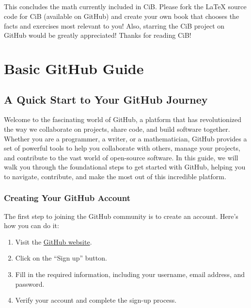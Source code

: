 \documentclass[a4paper,12pt]{book}
\begin{document}
\paragraph{}
This concludes the math currently included in CiB. Please fork the LaTeX source code for CiB (available on GitHub) and create your own book that chooses the facts and exercises most relevant to you! Also, starring the CiB project on GitHub would be greatly appreciated! Thanks for reading CiB!


\clearpage
{}
\appendix
\renewcommand{\thechapter}{\Roman{chapter}} %

\chapter{Basic GitHub Guide}
\section*{A Quick Start to Your GitHub Journey}

Welcome to the fascinating world of GitHub, a platform that has revolutionized the way we collaborate on projects, share code, and build software together. Whether you are a programmer, a writer, or a mathematician, GitHub provides a set of powerful tools to help you collaborate with others, manage your projects, and contribute to the vast world of open-source software. In this guide, we will walk you through the foundational steps to get started with GitHub, helping you to navigate, contribute, and make the most out of this incredible platform.

\subsection*{Creating Your GitHub Account}

The first step to joining the GitHub community is to create an account. Here’s how you can do it:

\begin{enumerate}
    \item Visit the \href{https://github.com/}{GitHub website}.
    \item Click on the “Sign up” button.
    \item Fill in the required information, including your username, email address, and password.
    \item Verify your account and complete the sign-up process.
\end{enumerate}
\end{document}
